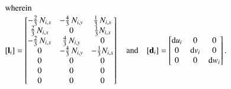 \begin{subequations}
\begin{align}
	\intertext{wherein}
	[\mathbf{l}_i] & = \begin{bmatrix}
		- \tfrac{2}{3} \, N_{i,x}  &  - \tfrac{4}{3} \,  N_{i,y}  &  \tfrac{1}{3} \,  N_{i,x} \\
		\tfrac{2}{3} \,  N_{i,x}  &  0 & \tfrac{1}{3}  N_{i,x}  \\
		- \tfrac{2}{3} \,  N_{i,x}  & \tfrac{4}{3} \, N_{i,y}  & 0 \\
		0 &  - \tfrac{4}{3} \,  N_{i,y}  & - \tfrac{1}{3}  N_{i,x}  \\
		0 &  0 & 0  \\
		0 &  0 & 0  \\
		0 &  0 & 0  \end{bmatrix}  \quad \text{and} \quad	[\mathbf{d}_i] = \begin{bmatrix}
		\mathrm{d} u_i & 0  & 0  \\
		0 &  \mathrm{d} v_i   & 0  \\
		0 & 0 & \mathrm{d} w_i \end{bmatrix} .
	\end{align}
\end{subequations}

